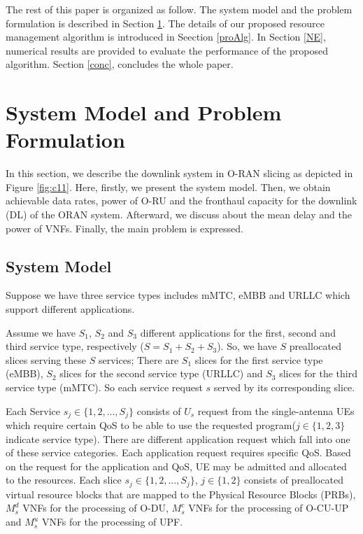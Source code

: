 \documentclass[conference]{IEEEtran}
\begin{document}
The rest of this paper is organized as follow. The system model and the problem formulation is described 
in Section \ref{systemmodel}. The details of our proposed resource management algorithm is 
introduced in Seection \ref{proAlg}. In Section \ref{NE}, numerical results are provided to evaluate the performance of the proposed algorithm. Section \ref{conc}, concludes the whole paper.

\section{System Model and Problem Formulation}\label{systemmodel}

In this section, we describe the downlink system in O-RAN slicing as depicted in Figure \ref{fig:c11}. 
Here, firstly, we present the system model. Then, we obtain achievable data rates, power of O-RU and the fronthaul capacity for the downlink (DL) of the ORAN system. Afterward, we discuss about the mean delay and the power of VNFs.
Finally, the main problem is expressed.
\subsection{System Model}
Suppose we have three service types includes mMTC, eMBB and URLLC which support different applications.

Assume we have $S_1$, $S_2$ and $S_3$ different applications for the first, second and third service type, respectively ($S = S_1 + S_2 + S_3$).
So, we have $S$ preallocated slices serving these $S$ services; There are $S_1$ slices for the first service type (eMBB), $S_2$ slices for the second service type (URLLC) and $S_3$ slices for the third service type (mMTC). So each service request $s$ served by its corresponding slice.

Each Service $s_j\in \{1,2,...,S_j\} $ consists of $U_{s}$ request from the 
single-antenna UEs which require certain QoS to be able to use the requested program($j \in \{1,2,3\}$ indicate service type).
There are different application request which fall into one of these service categories. Each application request requires specific QoS. Based on the request for the application and QoS, UE may be admitted and allocated to the resources.
Each slice $s_j \in \{1,2,...,S_j \}$, $j \in \{1,2\}$ consists of  preallocated virtual resource blocks that are mapped to the Physical Resource Blocks (PRBs), $M_s^{d}$ VNFs for the processing of O-DU, $M_s^{c}$ VNFs for the processing of O-CU-UP and $M_s^{u}$ VNFs for the processing of UPF.
\end{document}
